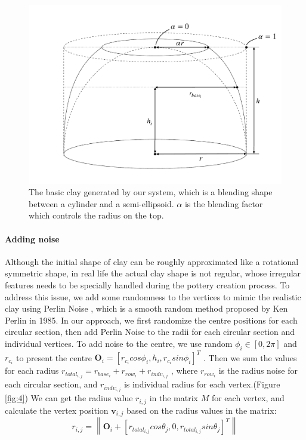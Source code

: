 \documentclass{svjour3}                     %
\begin{document}
\begin{figure}
\includegraphics[width=\textwidth]{fig3.pdf}
\caption{The basic clay generated by our system, which is a blending shape between a cylinder and a semi-ellipsoid. $\alpha$ is the blending factor which controls the radius on the top.}
\label{fig:3}
\end{figure}

\paragraph{Adding noise} Although the initial shape of clay can be roughly approximated like a rotational symmetric shape, in real life the actual clay shape is not regular, whose irregular features needs to be specially handled during the pottery creation process. To address this issue, we add some randomness to the vertices to mimic the realistic clay using Perlin Noise \cite{Perlin1985An}, which is a smooth random method proposed by Ken Perlin in 1985.
In our approach, we first randomize the centre positions for each circular section, then add Perlin Noise to the radii for each circular section and individual vertices.
To add noise to the centre, we use random $\phi_{i} \in [0, 2\pi]$ and $r_{c_{i}}$ to present the centre
$\mathbf{O}_{i} = \left[r_{c_{i}}cos\phi_{i}, h_{i}, r_{c_{i}}sin\phi_{i}\right]^T$
. Then we sum the values for each radius
$r_{total_{i,j}} = r_{base_{i}} + r_{row_{i}} + r_{indv_{i,j}}$
, where $r_{row_{i}}$ is the radius noise for each circular section, and $r_{indv_{i,j}}$ is individual radius for each vertex.(Figure \ref{fig:4}) We can get the radius value $r_{i,j}$ in the matrix $M$ for each vertex, and calculate the vertex position $\mathbf{v}_{i,j}$ based on the radius values in the matrix:
\begin{equation}
r_{i,j} = \left\|
\mathbf{O}_{i} + \left[ r_{total_{i,j}} cos \theta_{j},
0,
r_{total_{i,j}} sin \theta_{j}
\right]^T
\right\| 
\end{equation}
\end{document}
